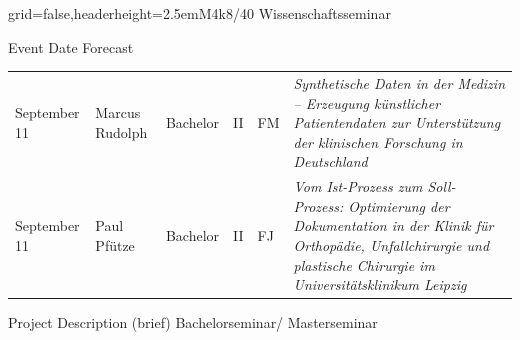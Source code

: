 \documentclass[english]{kiesgrube}
\begin{document}
\begin{poster}{grid=false,headerheight=2.5em}{}{M4k8/40 Wissenschaftsseminar}{}{}
\begin{posterbox}[name=event,below=progress,span=2]{Event Date Forecast}
\begin{tabulary}{\textwidth}{lllllL}
September 11	&Marcus Rudolph			&Bachelor	&II		&FM	&\emph{Synthetische Daten in der Medizin -- Erzeugung künstlicher Patientendaten zur Unterstützung der klinischen Forschung in Deutschland}\\
September 11	&Paul Pfütze			&Bachelor	&II		&FJ	&\emph{Vom Ist-Prozess zum Soll-Prozess: Optimierung der Dokumentation in der Klinik für Orthopädie, Unfallchirurgie und plastische Chirurgie im Universitätsklinikum Leipzig}\\
\end{tabulary}
\end{posterbox}
\begin{posterbox}[name=description,column=1,row=0]{Project Description (brief)}
Bachelorseminar/ Masterseminar
\end{posterbox}
\footer{}
\end{poster}
\end{document}
